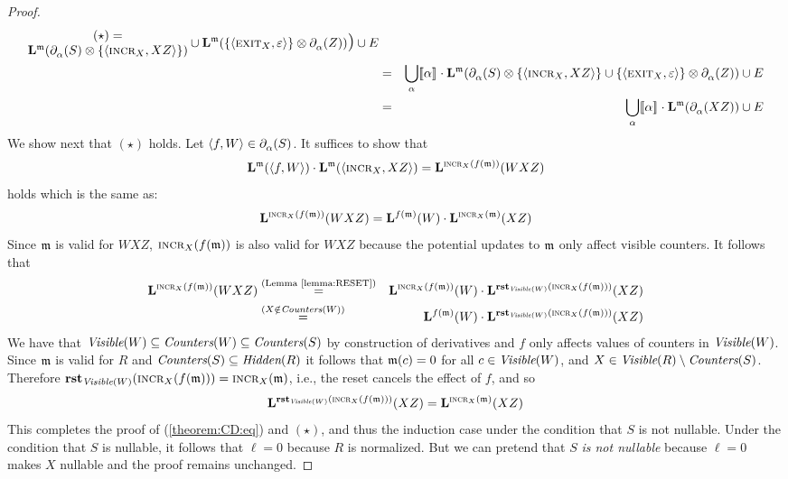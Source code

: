 \begin{proof}
\begin{eqnarray*}
{\begin{array}{@{}c@{}}
         \textrm{$(\star)$} =\\
        \LANG{\mem}{\CD{\alpha}{S}\otimes\spair{\IncrOp[X]}{XZ}}
    \end{array}
  }
  \cup \LANG{\mem}{\spair{\ExitOp[X]}{\emp}\otimes\CD{\alpha}{Z}} \RPAR \cup E \\
    &=&
  \bigcup_{\alpha}\den{\alpha}\cdot\LANG{\mem}{\CD{\alpha}{S}\otimes\spair{\IncrOp[X]}{XZ} \cup
    \spair{\ExitOp[X]}{\emp}\otimes\CD{\alpha}{Z}} \cup E \\
  &=& \bigcup_{\alpha}\den{\alpha}\cdot \LANG{\mem}{\CD{\alpha}{XZ}} \cup E
\end{eqnarray*}
We show next that $(\star)$ holds. Let $\pair{f}{W}\in\CD{\alpha}{S}$.
It suffices to show that
\[
\LANG{\mem}{\pair{f}{W}}\cdot\LANG{\mem}{\pair{\IncrOp[X]}{XZ}} = \LANG{\IncrOp[X](f(\mem))}{WXZ}
\]
holds which is the same as:
\begin{equation}
  \label{theorem:CD:eq}
\LANG{\IncrOp[X](f(\mem))}{WXZ} =
\LANG{f(\mem)}{W}\cdot\LANG{\IncrOp[X](\mem)}{XZ}
\end{equation}
Since $\mem$ is valid for $WXZ$, $\IncrOp[X](f(\mem))$ is also valid
for $WXZ$ because the potential updates to $\mem$ only affect visible counters.  It follows that
\begin{eqnarray*}
\LANG{\IncrOp[X](f(\mem))}{WXZ} &\stackrel{\textrm{(Lemma~\ref{lemma:RESET})}}{=}&
\LANG{\IncrOp[X](f(\mem))}{W}\cdot
\LANG{\RESET{\VISIBLE{W}}(\IncrOp[X](f(\mem)))}{XZ} \\
&\stackrel{(X\notin\COUNTERS{W})}{=}&
\LANG{f(\mem)}{W}\cdot
\LANG{\RESET{\VISIBLE{W}}(\IncrOp[X](f(\mem)))}{XZ} 
\end{eqnarray*}
We have that $\VISIBLE{W}\subseteq\COUNTERS{W}\subseteq\COUNTERS{S}$ by construction of
derivatives and $f$ only affects values of counters in $\VISIBLE{W}$. Since
$\mem$ is valid for $R$ and $\COUNTERS{S}\subseteq\HIDDEN{R}$ it
follows that $\mem(c)=0$ for all $c\in \VISIBLE{W}$, and
$X\in\VISIBLE{R}\setminus\COUNTERS{S}$.  Therefore
$\RESET{\VISIBLE{W}}(\IncrOp[X](f(\mem))) =
\IncrOp[X](\mem)$, i.e.,
the reset cancels the effect of $f$, and so
\[
\LANG{\RESET{\VISIBLE{W}}(\IncrOp[X](f(\mem)))}{XZ} 
=
\LANG{\IncrOp[X](\mem)}{XZ}
\]
This completes the proof of (\ref{theorem:CD:eq}) and $(\star)$, and thus
the induction case under the condition that $S$ is not nullable.
Under the condition that $S$ is nullable, it follows that $\ell=0$
because $R$ is normalized.  But we can pretend that $S$ \emph{is not
  nullable} because $\ell=0$ makes $X$ nullable and the proof remains
unchanged.


\end{proof}
